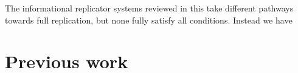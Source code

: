 The informational replicator systems reviewed in this  take different pathways towards full replication, but none fully satisfy all conditions. Instead we have  

%


\section{Previous work}

